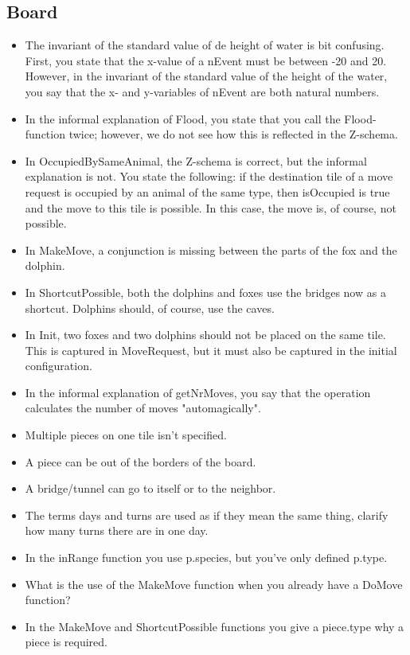 \documentclass[a4paper,11pt]{article}
\begin{document}
    \subsection{Board}
    \begin{itemize}
        \item The invariant of the standard value of de height of water is bit confusing. First, you state that the x-value of a nEvent must be between -20 and 20. However, in the invariant of the standard value of the height of the water, you say that the x- and y-variables of nEvent are both natural numbers.
        \item In the informal explanation of Flood, you state that you call the Flood-function twice; however, we do not see how this is reflected in the Z-schema.
        \item In OccupiedBySameAnimal, the Z-schema is correct, but the informal explanation is not. You state the following: if the destination tile of a move request is occupied by an animal of the same type, then isOccupied is true and the move to this tile is possible. In this case, the move is, of course, not possible.
        \item In MakeMove, a conjunction is missing between the parts of the fox and the dolphin.
        \item In ShortcutPossible, both the dolphins and foxes use the bridges now as a shortcut. Dolphins should, of course, use the caves.
        \item In Init, two foxes and two dolphins should not be placed on the same tile. This is captured in MoveRequest, but it must also be captured in the initial configuration.
        \item In the informal explanation of getNrMoves, you say that the operation calculates the number of moves "automagically".
        \item Multiple pieces on one tile isn't specified.
        \item A piece can be out of the borders of the board.
        \item A bridge/tunnel can go to itself or to the neighbor.
        \item The terms days and turns are used as if they mean the same thing, clarify how many turns there are in one day.
        \item In the inRange function you use p.species, but you've only defined p.type.
        \item What is the use of the MakeMove function when you already have a DoMove function?
        \item In the MakeMove and ShortcutPossible functions you give a piece.type why a piece is required.
    \end{itemize}
\end{document}
